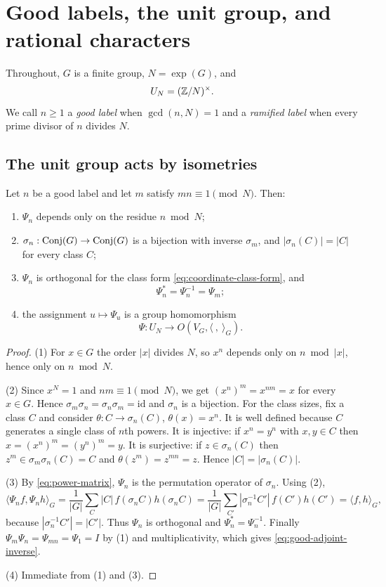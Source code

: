 \section{Good labels, the unit group, and rational characters}
\label{sec:goodlabels}

Throughout, \(G\) is a finite group, \(N=\exp(G)\), and
\[
 U_N=(\mathbb Z/N)^\times .
\]
We call \(n\geq1\) a \emph{good label} when \(\gcd(n,N)=1\) and a
\emph{ramified label} when every prime divisor of \(n\) divides \(N\).

\subsection{The unit group acts by isometries}

\begin{lemma}
\label{lem:good-labels}
Let \(n\) be a good label and let \(m\) satisfy \(mn\equiv1\pmod N\).  Then:
\begin{enumerate}
\item \(\Psi_n\) depends only on the residue \(n\bmod N\);
\item \(\sigma_n:\operatorname{Conj}(G)\to\operatorname{Conj}(G)\) is a bijection with inverse
\(\sigma_m\), and \(|\sigma_n(C)|=|C|\) for every class \(C\);
\item \(\Psi_n\) is orthogonal for the class form
\eqref{eq:coordinate-class-form}, and
\begin{equation}
 \Psi_n^*=\Psi_n^{-1}=\Psi_m;
 \label{eq:good-adjoint-inverse}
\end{equation}
\item the assignment \(u\mapsto\Psi_u\) is a group homomorphism
\[
 \Psi:U_N\longrightarrow O(V_G,\langle\ ,\ \rangle_G).
\]
\end{enumerate}
\end{lemma}

\begin{proof}
(1)  For \(x\in G\) the order \(|x|\) divides \(N\), so \(x^n\) depends only
on \(n\bmod|x|\), hence only on \(n\bmod N\).

(2)  Since \(x^N=1\) and \(nm\equiv1\pmod N\), we get \((x^n)^m=x^{nm}=x\)
for every \(x\in G\).  Hence \(\sigma_m\sigma_n=\sigma_n\sigma_m=\mathrm{id}\)
and \(\sigma_n\) is a bijection.  For the class sizes, fix a class \(C\) and
consider \(\theta:C\to\sigma_n(C)\), \(\theta(x)=x^n\).  It is well defined
because \(C\) generates a single class of \(n\)th powers.  It is injective:
if \(x^n=y^n\) with \(x,y\in C\) then \(x=(x^n)^m=(y^n)^m=y\).  It is
surjective: if \(z\in\sigma_n(C)\) then \(z^m\in\sigma_m\sigma_n(C)=C\) and
\(\theta(z^m)=z^{mn}=z\).  Hence \(|C|=|\sigma_n(C)|\).

(3)  By \eqref{eq:power-matrix}, \(\Psi_n\) is the permutation operator of
\(\sigma_n\).  Using (2),
\[
 \langle\Psi_nf,\Psi_nh\rangle_G
 =\frac1{|G|}\sum_{C}|C|\,f(\sigma_nC)h(\sigma_nC)
 =\frac1{|G|}\sum_{C'}|\sigma_n^{-1}C'|\,f(C')h(C')
 =\langle f,h\rangle_G,
\]
because \(|\sigma_n^{-1}C'|=|C'|\).  Thus \(\Psi_n\) is orthogonal and
\(\Psi_n^*=\Psi_n^{-1}\).  Finally \(\Psi_m\Psi_n=\Psi_{mn}=\Psi_1=I\) by (1)
and multiplicativity, which gives \eqref{eq:good-adjoint-inverse}.

(4)  Immediate from (1) and (3).
\end{proof}

